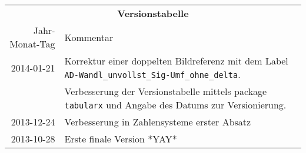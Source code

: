 \begin{table}[htp]
\centering
\begin{tabularx}{\columnwidth}{rp{}}
\multicolumn{2}{c}{\textbf{Versionstabelle}} \\
Jahr-Monat-Tag & Kommentar \\ \hline
2014-01-21 & Korrektur einer doppelten Bildreferenz mit dem Label \texttt{AD-Wandl\_unvollst\_Sig-Umf\_ohne\_delta}. \\
                 & Verbesserung der Versionstabelle mittels package \texttt{tabularx} und Angabe des Datums zur Versionierung. \\
2013-12-24 & Verbesserung in Zahlensysteme erster Absatz \\
2013-10-28 & Erste finale Version *YAY* \\
\end{tabularx}
\end{table}